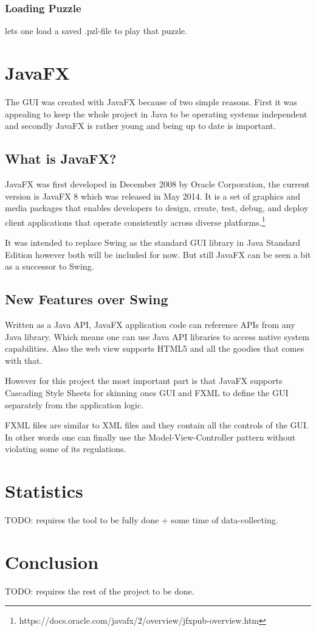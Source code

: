 \subsection{Loading Puzzle} lets one load a saved .pzl-file to play that puzzle.

\chapter{JavaFX} \label{JavaFX}
The GUI was created with JavaFX because of two simple reasons. First it was appealing to keep the whole project in Java to be operating systems independent and secondly JavaFX is rather young and being up to date is important.

\section{What is JavaFX?}
JavaFX was first developed in December 2008 by Oracle Corporation, the current version is JavaFX 8 which was released in May 2014. It is a set of graphics and media packages that enables developers to design, create, test, debug, and deploy client applications that operate consistently across diverse platforms.\footnote{https://docs.oracle.com/javafx/2/overview/jfxpub-overview.htm} 

It was intended to replace Swing as the standard GUI library in Java Standard Edition however both will be included for now. But still JavaFX can be seen a bit as a successor to Swing.

\section{New Features over Swing}
Written as a Java API, JavaFX application code can reference APIs from any Java library. Which means one can use Java API libraries to access native system capabilities. 
Also the web view supports HTML5 and all the goodies that comes with that.

However for this project the most important part is that JavaFX supports Cascading Style Sheets for skinning ones GUI and FXML to define the GUI separately from the application logic.

FXML files are similar to XML files and they contain all the controls of the GUI. In other words one can finally use the Model-View-Controller pattern without violating some of its regulations.

\chapter{Statistics} \label{Statistics}
TODO: requires the tool to be fully done + some time of data-collecting.

\chapter{Conclusion} \label{Conclusion}
TODO: requires the rest of the project to be done.